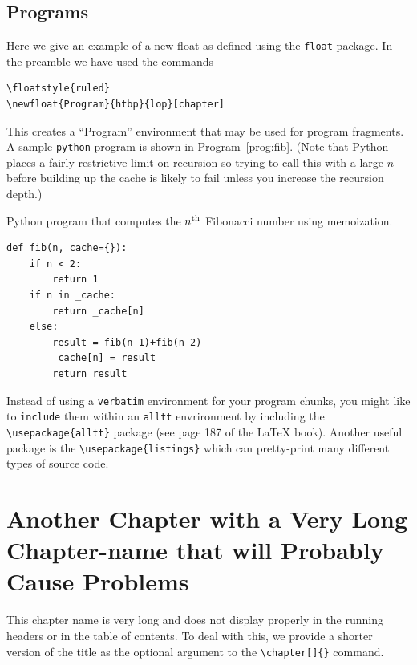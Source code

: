 \documentclass[msc,oneside]{ubcthesis}
\begin{document}
\section{Programs}
Here we give an example of a new float as defined using the
\texttt{float} package.  In the preamble we have used the commands
\begin{verbatim}
\floatstyle{ruled}
\newfloat{Program}{htbp}{lop}[chapter]
\end{verbatim}
This creates a ``Program'' environment that may be used for program
fragments.  A sample \texttt{python} program is shown in
Program~\ref{prog:fib}.  (Note that Python places a fairly restrictive
limit on recursion so trying to call this with a large $n$ before
building up the cache is likely to fail unless you increase the
recursion depth.)
\begin{Program}
  \caption{\label{prog:fib} Python program that computes the $n^{\rm
      th}$ Fibonacci number using memoization.}
\begin{verbatim}
def fib(n,_cache={}):
    if n < 2:
        return 1
    if n in _cache:
        return _cache[n]
    else:
        result = fib(n-1)+fib(n-2)
        _cache[n] = result
        return result
\end{verbatim}
\end{Program}
Instead of using a \texttt{verbatim} environment for your program
chunks, you might like to \texttt{include} them within an
\texttt{alltt} envrironment by including the \verb|\usepackage{alltt}|
package (see page 187 of the \LaTeX{} book).  Another useful package
is the \verb|\usepackage{listings}| which can pretty-print many
different types of source code.

\newpage

\chapter[Another Chapter\ldots]{Another Chapter with a Very Long
  Chapter-name that will Probably Cause Problems}
\label{cha:apple_ref}

This chapter name is very long and does not display properly in the
running headers or in the table of contents.  To deal with this, we
provide a shorter version of the title as the optional argument to the
\verb|\chapter[]{}| command.
\end{document}
